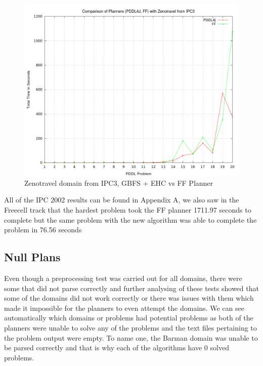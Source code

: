 \begin{figure}[!htb]
    \centering
    \includegraphics[scale=0.35]{ZenoTimeFF.png}
    \caption{Zenotravel domain from IPC3, GBFS + EHC vs FF Planner }
    \label{fig:ZenoTravelAgainstFF}
\end{figure}

All of the IPC 2002 results can be found in Appendix A, we also saw in the Freecell track that the hardest problem took the FF planner 1711.97 seconds to complete but the same problem with the new algorithm was able to complete the problem in 76.56 seconds
\clearpage
\subsection{Null Plans}
Even though a preprocessing test was carried out for all domains, there were some that did not parse correctly and further analysing of these tests showed that some of the domains did not work correctly or there was issues with them which made it impossible for the planners to even attempt the domains. We can see automatically which domains or problems had potential problems as both of the planners were unable to solve any of the problems and the text files pertaining to the problem output were empty. To name one, the Barman domain was unable to be parsed correctly and that is why each of the algorithms have 0 solved problems.
